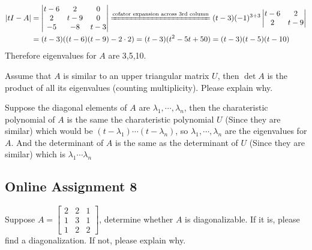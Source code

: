 \documentclass[a4paper,10pt]{article}
\begin{document}
\begin{solution}
\begin{align*}
\left|tI-A\right|&=\left|\begin{matrix}
t-6&2&0\\
2&t-9&0\\
-5&-8&t-3
\end{matrix}\right|\xequal{\text{cofator expansion across 3rd column}}(t-3)(-1)^{3+3}\left|\begin{matrix}
t-6&2\\
2&t-9
\end{matrix}\right|\\
&=(t-3)((t-6)(t-9)-2\cdot 2)=(t-3)(t^2-5t+50)=(t-3)(t-5)(t-10)
\end{align*}
Therefore eigenvalues for $A$ are 3,5,10.
\end{solution}

\begin{problem}
Assume that $A$ is similar to an upper triangular matrix $U$, then $\det A$ is the product of all its eigenvalues (counting multiplicity). Please explain why.
\end{problem}

\begin{solution}
Suppose the diagonal elements of $A$ are $\lambda_1,\cdots,\lambda_n$, then the charateristic polynomial of $A$ is the same the charateristic polynomial $U$ (Since they are similar) which would be $(t-\lambda_1)\cdots(t-\lambda_n)$, so $\lambda_1,\cdots,\lambda_n$ are the eigenvalues for $A$. And the determinant of $A$ is the same as the determinant of $U$ (Since they are similar) which is $\lambda_1\cdots\lambda_n$
\end{solution}

\subsection{Online Assignment 8}

\begin{problem}
Suppose $A=\begin{bmatrix}
2&2&1\\
1&3&1\\
1&2&2
\end{bmatrix}$, determine whether $A$ is diagonalizable. If it is, please find a diagonalization. If not, please explain why.
\end{problem}
\end{document}
